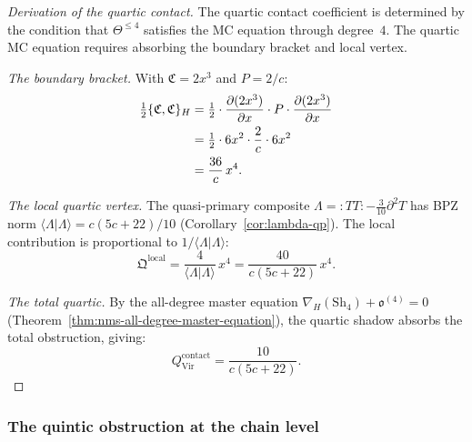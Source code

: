 \begin{proof}[Derivation of the quartic contact]
The quartic contact coefficient is determined by the
condition that $\Theta^{\leq 4}$ satisfies the MC equation
through degree~$4$. The quartic MC equation requires
absorbing the boundary bracket and local vertex.

\emph{The boundary bracket.}
With $\mathfrak{C} = 2x^3$ and $P = 2/c$:
\begin{align}
\tfrac{1}{2}\{\mathfrak{C}, \mathfrak{C}\}_H
&= \tfrac{1}{2} \cdot
 \frac{\partial(2x^3)}{\partial x} \cdot P \cdot
 \frac{\partial(2x^3)}{\partial x} \notag \\
&= \tfrac{1}{2} \cdot 6x^2 \cdot \frac{2}{c}
 \cdot 6x^2 \notag \\
&= \frac{36}{c}\,x^4. \label{eq:virasoro-boundary-bracket}
\end{align}

\emph{The local quartic vertex.}
The quasi-primary composite
$\Lambda = {:}TT{:} - \frac{3}{10}\partial^2 T$
has BPZ norm
$\langle \Lambda | \Lambda \rangle = c(5c+22)/10$
(Corollary~\ref{cor:lambda-qp}).
The local contribution is proportional to $1/\langle\Lambda|\Lambda\rangle$:
\begin{equation}\label{eq:virasoro-local-quartic}
\mathfrak{Q}^{\mathrm{local}}
= \frac{4}{\langle\Lambda|\Lambda\rangle}\,x^4
= \frac{40}{c(5c+22)}\,x^4.
\end{equation}

\emph{The total quartic.}
By the all-degree master equation
$\nabla_H(\mathrm{Sh}_4) + \mathfrak{o}^{(4)} = 0$
(Theorem~\ref{thm:nms-all-degree-master-equation}),
the quartic shadow absorbs the total obstruction, giving:
\begin{equation}\label{eq:virasoro-contact-result}
Q^{\mathrm{contact}}_{\mathrm{Vir}}
= \frac{10}{c(5c+22)}.
\end{equation}
\end{proof}

\subsubsection{The quintic obstruction at the chain level}
\label{subsubsec:quintic-chain-level}

